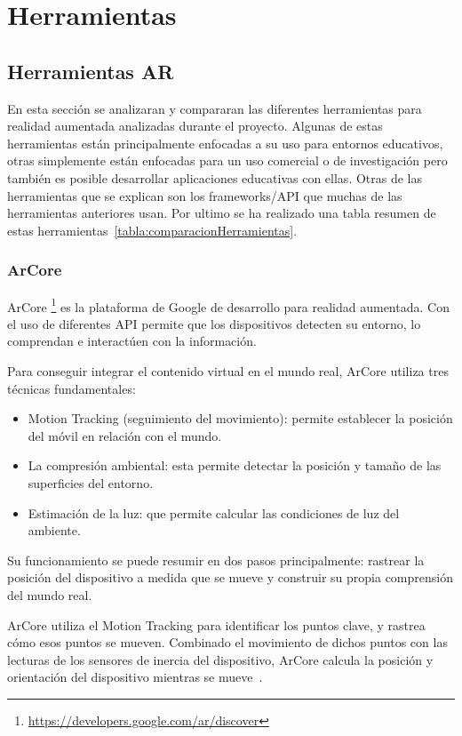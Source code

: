 
\section{Herramientas}
\subsection{Herramientas AR}
En esta sección se analizaran y compararan las diferentes herramientas para realidad aumentada analizadas durante el proyecto. 
Algunas de estas herramientas están principalmente enfocadas a su uso para entornos educativos, otras simplemente están enfocadas para un uso comercial o de investigación pero también es posible desarrollar aplicaciones educativas con ellas. Otras de las herramientas que se explican son los frameworks/API que muchas de las herramientas anteriores usan. Por ultimo se ha realizado una tabla resumen de estas herramientas~\ref{tabla:comparacionHerramientas}.


\subsubsection{ArCore}

ArCore \footnote{\url{https://developers.google.com/ar/discover}} es la plataforma de Google de desarrollo para realidad aumentada. Con el uso de diferentes API permite que los dispositivos detecten su entorno, lo comprendan e interactúen con la información.

Para conseguir integrar el contenido virtual en el mundo real, ArCore utiliza tres técnicas fundamentales:
\begin{itemize}
	\item Motion Tracking (seguimiento del movimiento): permite establecer la posición del móvil en relación con el mundo.
	\item La compresión ambiental: esta permite detectar la posición y tamaño de las superficies del entorno.
	\item Estimación de la luz: que permite calcular las condiciones de luz del ambiente.
\end{itemize}

Su funcionamiento se puede resumir en dos pasos principalmente: rastrear la posición del dispositivo a medida que se mueve y construir su propia comprensión del mundo real.

ArCore utiliza el Motion Tracking para identificar los puntos clave, y rastrea cómo esos puntos se mueven. Combinado el movimiento de dichos puntos con  las lecturas de los sensores de inercia del dispositivo, ArCore calcula la posición y orientación del dispositivo mientras se mueve~\cite{google}.

